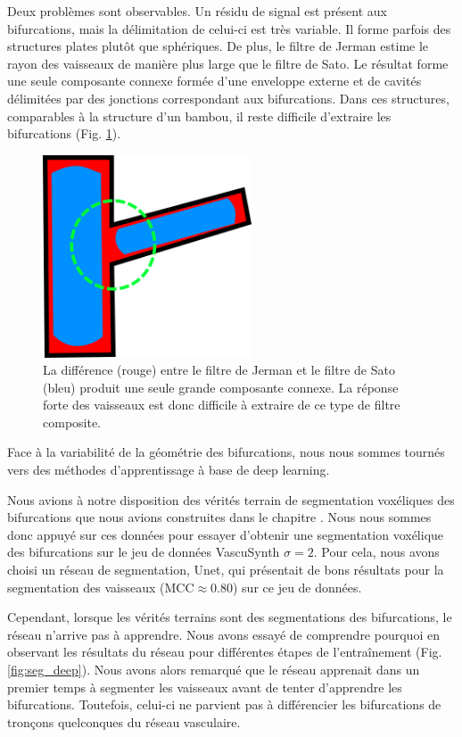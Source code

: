 Deux problèmes sont observables. Un résidu de signal est présent aux bifurcations, mais la délimitation de celui-ci est très variable. Il forme parfois des structures plates plutôt que sphériques. De plus, le filtre de Jerman estime le rayon des vaisseaux de manière plus large que le filtre de Sato. Le résultat forme une seule composante connexe formée d'une enveloppe externe et de cavités délimitées par des jonctions correspondant aux bifurcations. Dans ces structures, comparables à la structure d'un bambou, il reste difficile d'extraire les bifurcations (Fig. \ref{fig:combo_vesselness}).

\begin{figure}[!ht]
    \centering
    \includegraphics[height=6cm]{Images/combo_vesselness_2D.png}
    \caption{La différence (rouge) entre le filtre de Jerman et le filtre de Sato (bleu) produit une seule grande composante connexe. La réponse forte des vaisseaux est donc difficile à extraire de ce type de filtre composite.}
    \label{fig:combo_vesselness}
\end{figure}


Face à la variabilité de la géométrie des bifurcations, nous nous sommes tournés vers des méthodes d'apprentissage à base de deep learning.

Nous avions à notre disposition des vérités terrain de segmentation voxéliques des bifurcations que nous avions construites dans le chapitre \chapBenchN{}. Nous nous sommes donc appuyé sur ces données pour essayer d'obtenir une segmentation voxélique des bifurcations sur le jeu de données VascuSynth $\sigma=2$. Pour cela, nous avons choisi un réseau de segmentation, Unet, qui présentait de bons résultats pour la segmentation des vaisseaux (MCC$\approx0.80$) sur ce jeu de données.

Cependant, lorsque les vérités terrains sont des segmentations des bifurcations, le réseau n'arrive pas à apprendre. Nous avons essayé de comprendre pourquoi en observant les résultats du réseau pour différentes étapes de l'entraînement (Fig. \ref{fig:seg_deep}). Nous avons alors remarqué que le réseau apprenait dans un premier temps à segmenter les vaisseaux avant de tenter d'apprendre les bifurcations. Toutefois, celui-ci ne parvient pas à différencier les bifurcations de tronçons quelconques du réseau vasculaire.

